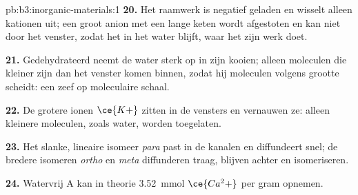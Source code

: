 \begin{solution}{pb:b3:inorganic-materials:1}
\textbf{20.} Het raamwerk is negatief geladen en wisselt alleen kationen
uit; een groot anion met een lange keten wordt afgestoten en kan niet
door het venster, zodat het in het water blijft, waar het zijn werk doet.

\textbf{21.} Gedehydrateerd neemt de  water sterk op in zijn kooien;
alleen moleculen die kleiner zijn dan het venster komen binnen, zodat hij
moleculen volgens grootte scheidt: een zeef op moleculaire schaal.

\textbf{22.} De grotere ionen $\ce{K+}$ zitten in de vensters en vernauwen ze: alleen kleinere
moleculen, zoals water, worden toegelaten.

\textbf{23.} Het slanke, lineaire isomeer \textit{para} past in de kanalen en diffundeert snel; de
bredere isomeren \textit{ortho} en \textit{meta} diffunderen traag, blijven achter en isomeriseren.

\textbf{24.} Watervrij  A kan in theorie \qty{3.52}{mmol} $\ce{Ca^2+}$ per gram opnemen.
\end{solution}
